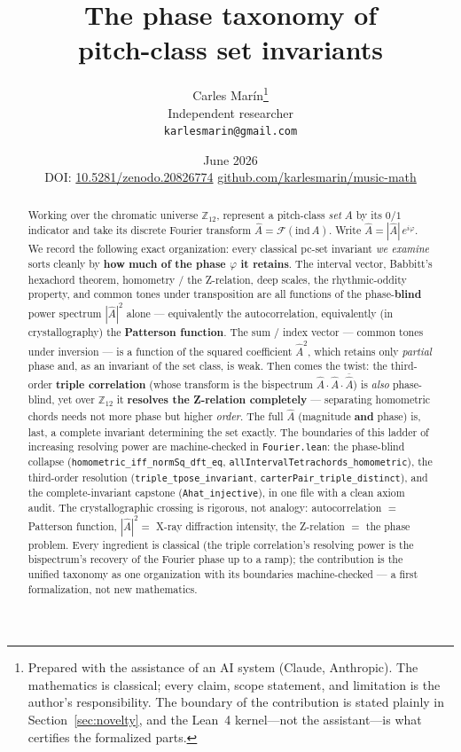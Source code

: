 \documentclass[11pt]{article}
\title{\bf The phase taxonomy of\\ pitch-class set invariants}
\author{Carles Mar\'in\thanks{Prepared with the assistance of an AI system (Claude, Anthropic).
The mathematics is classical; every claim, scope statement, and limitation is the author's
responsibility. The boundary of the contribution is stated plainly in Section~\ref{sec:novelty}, and
the Lean~4 kernel---not the assistant---is what certifies the formalized parts.}\\[3pt]
  \normalsize Independent researcher\\
  \normalsize \texttt{karlesmarin@gmail.com}}
\date{June 2026\\[3pt]\normalsize DOI: \href{https://doi.org/10.5281/zenodo.20826774}{10.5281/zenodo.20826774}
\quad\textbullet\quad \href{https://github.com/karlesmarin/music-math}{github.com/karlesmarin/music-math}}
\newcommand{\lean}[1]{\texttt{#1}}
\newcommand{\Ztwelve}{\mathbb{Z}_{12}}
\newcommand{\Ahat}{\hat{A}}
\begin{document}
\maketitle

\begin{abstract}\noindent
Working over the chromatic universe $\Ztwelve$, represent a pitch-class \emph{set} $A$ by its $0/1$
indicator and take its discrete Fourier transform $\Ahat=\mathcal{F}(\mathrm{ind}\,A)$. Write
$\Ahat=|\Ahat|\,e^{i\varphi}$. We record the following exact organization: every classical pc-set
invariant \emph{we examine} sorts cleanly by \textbf{how much of the phase $\varphi$ it retains}. The
interval vector, Babbitt's hexachord theorem, homometry / the Z-relation, deep scales, the
rhythmic-oddity property, and common tones under transposition are all functions of the
phase-\textbf{blind} power spectrum $|\Ahat|^2$ alone --- equivalently the autocorrelation, equivalently
(in crystallography) the \textbf{Patterson function}. The sum / index vector --- common tones under inversion --- is a
function of the squared coefficient $\Ahat^2$, which retains only \emph{partial} phase and, as an invariant
of the set class, is weak. Then comes the twist: the third-order \textbf{triple correlation} (whose
transform is the bispectrum $\Ahat\cdot\Ahat\cdot\overline{\Ahat}$) is \emph{also} phase-blind, yet over
$\Ztwelve$ it \textbf{resolves the Z-relation completely} --- separating homometric chords needs not more
phase but higher \emph{order}. The full $\Ahat$ (magnitude \textbf{and} phase) is, last, a complete
invariant determining the set exactly. The boundaries of this ladder of increasing resolving power are
machine-checked in \lean{Fourier.lean}: the phase-blind collapse (\lean{homometric\_iff\_normSq\_dft\_eq},
\lean{allIntervalTetrachords\_homometric}), the third-order resolution (\lean{triple\_tpose\_invariant},
\lean{carterPair\_triple\_distinct}), and the complete-invariant capstone (\lean{Ahat\_injective}), in one
file with a clean axiom audit. The crystallographic crossing is rigorous, not analogy: autocorrelation $=$
Patterson function, $|\Ahat|^2=$ X-ray diffraction intensity, the Z-relation $=$ the phase problem. Every
ingredient is classical (the triple correlation's resolving power is the bispectrum's recovery of the
Fourier phase up to a ramp); the contribution is the unified taxonomy as one organization with its
boundaries machine-checked --- a first formalization, not new mathematics.
\end{abstract}
\end{document}
